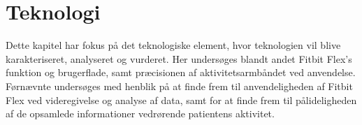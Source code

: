 \chapter{Teknologi}
Dette kapitel har fokus på det teknologiske element, hvor teknologien vil blive karakteriseret, analyseret og vurderet. Her undersøges blandt andet Fitbit Flex's funktion og brugerflade, samt præcisionen af aktivitetsarmbåndet ved anvendelse. Førnævnte undersøges med henblik på at finde frem til anvendeligheden af Fitbit Flex ved videregivelse og analyse af data, samt for at finde frem til pålideligheden af de opsamlede informationer vedrørende patientens aktivitet.









